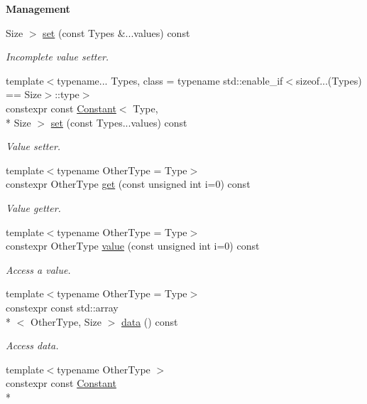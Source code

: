 \begin{Indent}{\bf Management}
\begin{DoxyCompactItemize}
Size $>$ \hyperlink{exceptionmagrathea_1_1Constant_ad3e1362e8722e3785e93461393e6f167}{set} (const Types \&...values) const 
\begin{DoxyCompactList}\small\item\em Incomplete value setter. \end{DoxyCompactList}\item 
{\footnotesize template$<$typename... Types, class  = typename std\-::enable\-\_\-if$<$sizeof...(\-Types) == Size$>$\-::type$>$ }\\constexpr const \hyperlink{exceptionmagrathea_1_1Constant}{Constant}$<$ Type, \\*
Size $>$ \hyperlink{exceptionmagrathea_1_1Constant_a85b61beaf38cb8748b694b5557e274da}{set} (const Types...\-values) const 
\begin{DoxyCompactList}\small\item\em Value setter. \end{DoxyCompactList}\item 
{\footnotesize template$<$typename Other\-Type  = Type$>$ }\\constexpr Other\-Type \hyperlink{exceptionmagrathea_1_1Constant_abb1a14f5e5f79616bad2c7a41e32c02a}{get} (const unsigned int i=0) const 
\begin{DoxyCompactList}\small\item\em Value getter. \end{DoxyCompactList}\item 
{\footnotesize template$<$typename Other\-Type  = Type$>$ }\\constexpr Other\-Type \hyperlink{exceptionmagrathea_1_1Constant_a6c5801d652d4bb77e5dd0597ee4653b4}{value} (const unsigned int i=0) const 
\begin{DoxyCompactList}\small\item\em Access a value. \end{DoxyCompactList}\item 
{\footnotesize template$<$typename Other\-Type  = Type$>$ }\\constexpr const std\-::array\\*
$<$ Other\-Type, Size $>$ \hyperlink{exceptionmagrathea_1_1Constant_abf9e53eb59e908e22bc1ee962d3f5d52}{data} () const 
\begin{DoxyCompactList}\small\item\em Access data. \end{DoxyCompactList}\item 
{\footnotesize template$<$typename Other\-Type $>$ }\\constexpr const \hyperlink{exceptionmagrathea_1_1Constant}{Constant}\\*

\end{DoxyCompactItemize}
\end{Indent}
